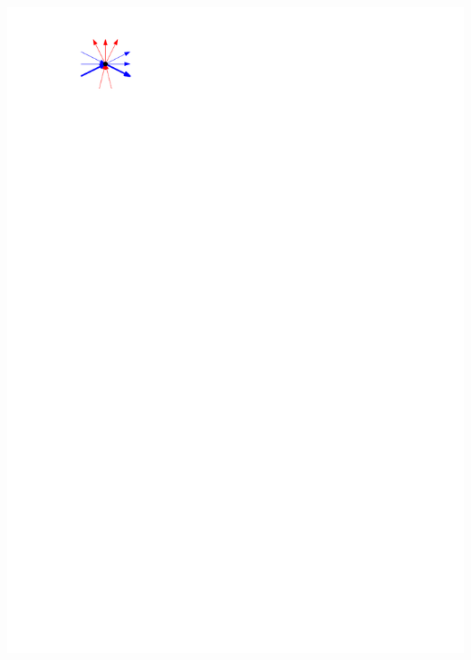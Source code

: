 \documentclass[a4paper]{article}
\begin{document}
\includegraphics[scale=.9]{./unifiedAlgo/img/sweep/bottompath.pdf}
\clearpage%
\end{document}
